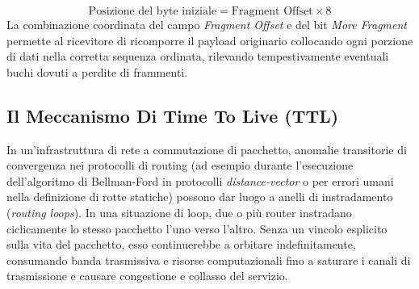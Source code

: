 \documentclass[11pt, a4paper]{article}
\begin{document}
\begin{enumerate}
    \[
    \text{Posizione del byte iniziale} = \text{Fragment Offset} \times 8
    \]
    La combinazione coordinata del campo \emph{Fragment Offset} e del bit \emph{More Fragment} permette al ricevitore di ricomporre il payload originario collocando ogni porzione di dati nella corretta sequenza ordinata, rilevando tempestivamente eventuali buchi dovuti a perdite di frammenti.
\end{enumerate}

\subsection{Il Meccanismo Di Time To Live (TTL)}
In un'infrastruttura di rete a commutazione di pacchetto, anomalie transitorie di convergenza nei protocolli di routing (ad esempio durante l'esecuzione dell'algoritmo di Bellman-Ford in protocolli \emph{distance-vector} o per errori umani nella definizione di rotte statiche) possono dar luogo a anelli di instradamento (\emph{routing loops}). In una situazione di loop, due o più router instradano ciclicamente lo stesso pacchetto l'uno verso l'altro. Senza un vincolo esplicito sulla vita del pacchetto, esso continuerebbe a orbitare indefinitamente, consumando banda trasmissiva e risorse computazionali fino a saturare i canali di trasmissione e causare congestione e collasso del servizio.

\end{document}
